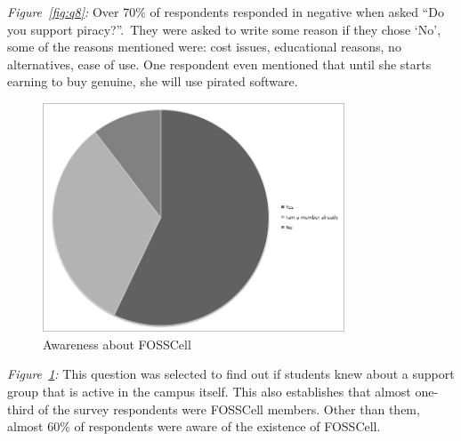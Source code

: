 \emph{Figure~\ref{fig:q8}:} Over 70\% of respondents responded in negative when asked ``Do you support piracy?''.\ They were asked to write some reason if they chose `No', some of the reasons mentioned were: cost issues, educational reasons, no alternatives, ease of use. One respondent even mentioned that until she starts earning to buy genuine, she will use pirated software.
\newpage
\begin{figure}[h!]
\centering
\includegraphics[width=0.8\textwidth]{./q9.png}
\caption{Awareness about FOSSCell}
\label{fig:q9}
\end{figure}

\emph{Figure~\ref{fig:q9}:} This question was selected to find out if students knew about a support group that is active in the campus itself. This also establishes that almost one-third of the survey respondents were FOSSCell members. Other than them, almost 60\% of respondents were aware of the existence of FOSSCell.
